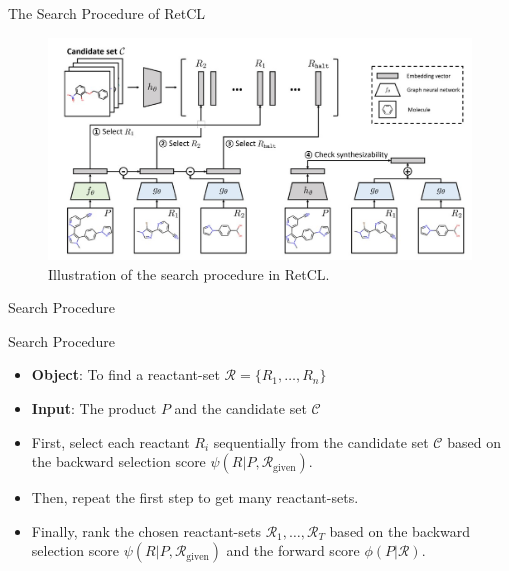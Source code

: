 \documentclass{beamer}		%
\begin{document}
\begin{frame}{The Search Procedure of RetCL}

\begin{figure}[t]
\centerline{\includegraphics[width=1.0\linewidth]{figure1.jpg}}
\vspace{-10pt}
\caption{Illustration of the search procedure in RetCL.}
\label{fig1}
\end{figure}
    
\end{frame}



\begin{frame}[noframenumbering]
\begin{itemize}
    \begin{LARGE}
    \item {}
    \item Search Procedure
    \item {}
    \item {}
    \end{LARGE}
\end{itemize}
\end{frame}



\begin{frame}{Search Procedure}

\begin{itemize}
    \item \textbf{Object}: To find a reactant-set $\mathcal{R}=\{R_1,\ldots,R_n\}$
    \item \textbf{Input}: The product $P$ and the candidate set $\mathcal{C}$
    \item First, select each reactant $R_i$ sequentially from the candidate set $\mathcal{C}$ based on the backward selection score $\psi(R|P, \mathcal{R}_{\text{given}})$.
    \item Then, repeat the first step to get many reactant-sets.
    \item Finally, rank the chosen reactant-sets $\mathcal{R}_1, \ldots, \mathcal{R}_T$ based on the backward selection score $\psi(R|P, \mathcal{R}_{\text{given}})$ and the forward score $\phi(P|\mathcal{R})$.
\end{itemize}

\end{frame}
\end{document}
